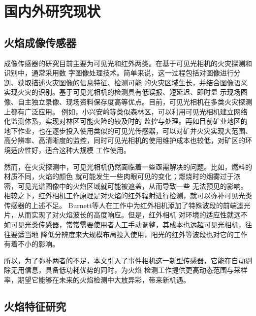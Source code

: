 \section{国内外研究现状}

\subsection{火焰成像传感器}

成像传感器的研究目前主要为可见光和红外两类。在基于可见光相机的火灾探测和识别中，通常采用数
字图像处理技术。简单来说，这一过程包括对图像进行分割、获取描述火灾图像的信息特征、检测可能
的火灾区域生长，并结合图像语义实现火灾的识别。基于可见光相机的检测具有低误报、短延迟、即时显
示现场图像、自主独立录像、现场资料保存度高等优点。目前，可见光相机在多类火灾探测上都有广泛应用。
例如，小兴安岭等类似森林区，可以利用可见光相机建立网络化监测体系，实现对林区可能火险的较及时的
监控与处理\cite{liujinxin}。再如目前矿业地区的地下作业，也在逐步投入使用类似的可见光传感器，可以对矿井火灾实现大范围、
高分辨率、高清晰度的监控，同时可见光相机的使用维护成本也较低，对矿区的环境适应性好，适合这种大规模
工作使用\cite{wyb}。

然而，在火灾探测中，可见光相机仍然面临着一些亟需解决的问题。比如，燃料的材质不同，火焰的颜色
就可能发生一些肉眼可见的变化；燃烧时的烟雾过于浓密，可见光谱图像中的火焰区域就可能被遮盖，从而导致一些
无法预见的影响。相较之下，红外相机工作原理是对火焰的红外辐射进行检测，就可以弥补可见光类传感器的上述不足。
Burnett等人\cite{burnett2018low}在工作中为红外相机添加了特殊波段的前端滤光片，从而实现了对火焰波长的高度响应。但是，红外相机
对环境的适应性就远不如可见光类传感器，常常需要使用者人工手动调整，其成本也远超可见光相机，往往要适当地
降低分辨度来大规模布局投入使用，阳光的红外等波段也对它的工作有着不小的影响。

所以，为了弥补两者的不足，本文引入了事件相机这一新型传感器，它能在自动剔除无用信息，具备低功耗优势的同时，为火焰
检测工作提供更高动态范围与采样率，期望它能够在未来的火焰检测中大放异彩，带来新机遇。

\subsection{火焰特征研究}

